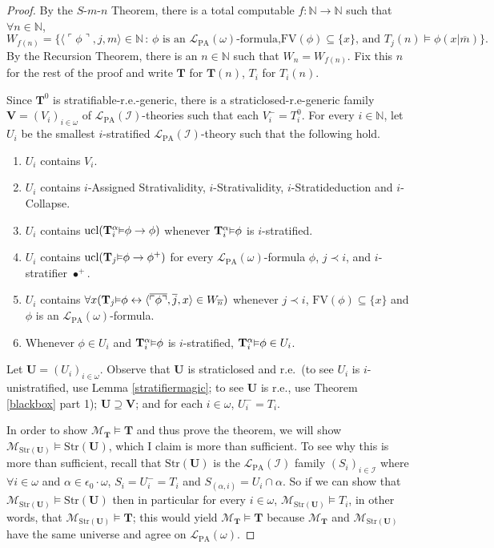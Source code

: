 \documentclass[reqno]{article}
\theoremstyle{definition}
\def\N{\mathbb{N}}
\def\L{\mathscr{L}}
\def\M{\mathscr{M}}
\def\T{\mathbf{T}}
\def\S{\mathbf{S}}
\def\U{\mathbf{U}}
\def\V{\mathbf{V}}
\def\FV{\mathrm{FV}}
\def\LPA{\L_{\mathrm{PA}}}
\def\epom{\epsilon_0\cdot\omega}
\def\indset{\mathcal I}
\renewcommand{\Pr}[1]{\T_{#1}\mbox{\small${\vDash}$}}
\newcommand{\Prr}[2]{\T^{#1}_{#2}\mbox{\small${\vDash}$}}
\newcommand{\ucl}[1]{\mathrm{ucl}(#1)}
\newcommand{\str}[1]{\mathrm{Str}(#1)} \newcommand{\Str}[1]{\str{#1}}
\begin{document}
\begin{proof}
By the $S$-$m$-$n$ Theorem, there is a total computable $f:\N\to\N$ such that $\forall n\in\N$,
\[
W_{f(n)}=\{\langle\ulcorner\phi\urcorner,j,m\rangle\in\N\,:\,\mbox{$\phi$ is an $\LPA(\omega)$-formula,
$\FV(\phi)\subseteq\{x\}$, and $T_j(n)\models\phi(x|\overline m)$}\}.
\]
By the Recursion Theorem, there is an $n\in\N$ such that $W_n=W_{f(n)}$.  Fix this $n$ for the rest of the proof
and write $\T$ for $\T(n)$, $T_i$ for $T_i(n)$.

Since $\T^0$ is stratifiable-r.e.-generic, there is 
a straticlosed-r.e-generic
family $\V=(V_i)_{i\in\omega}$ of $\LPA(\indset)$-theories such that each $V^-_i=T^0_i$.
For every $i\in\N$, let $U_i$ be the smallest
$i$-stratified $\LPA(\indset)$-theory such that the following hold.
\begin{enumerate}
\item $U_i$ contains $V_i$.
\item $U_i$ contains $i$-Assigned Strativalidity, $i$-Strativalidity, $i$-Stratideduction and $i$-Collapse.
\item $U_i$ contains $\ucl{\Prr\alpha i\phi\rightarrow\phi}$ whenever $\Prr\alpha i\phi$ is $i$-stratified.
\item $U_i$ contains $\ucl{\Pr j\phi\rightarrow\phi^+}$ for every $\LPA(\omega)$-formula $\phi$, $j\prec i$,
and $i$-stratifier $\bullet^+$.
\item $U_i$ contains $\forall x(\Pr j\phi\leftrightarrow\langle\overline{\ulcorner\phi\urcorner},\overline j,x\rangle\in W_{\overline n})$
whenever $j\prec i$, $\FV(\phi)\subseteq\{x\}$ and $\phi$ is an $\LPA(\omega)$-formula.
\item Whenever $\phi\in U_i$ and $\Prr\alpha i\phi$ is $i$-stratified, $\Prr\alpha i\phi\in U_i$.
\end{enumerate}
Let $\U=(U_i)_{i\in\omega}$.  Observe that $\U$ is straticlosed and r.e.~(to see $U_i$ is
$i$-unistratified, use
Lemma \ref{stratifiermagic}; to see $\U$ is r.e., use
Theorem \ref{blackbox} part 1); $\U\supseteq\V$; and for each $i\in\omega$,
$U_i^-=T_i$.


In order to show $\M_\T\models\T$ and thus prove the theorem,
we will show $\M_{\str{\U}}\models \str{\U}$, which I claim is more
than sufficient. To see why this is more than sufficient, recall that
$\str{\U}$ is the $\LPA(\indset)$ family $(S_i)_{i\in\indset}$
where $\forall i\in\omega$ and $\alpha\in\epom$, $S_i=U^-_i=T_i$ and
$S_{(\alpha,i)}=U_i\cap \alpha$.
So if we can show that $\M_{\str{\U}}\models \str{\U}$ then in particular
for every $i\in\omega$, $\M_{\str{\U}}\models T_i$, in other words,
that $\M_{\str{\U}}\models\T$; this would yield $\M_\T\models\T$ because
$\M_\T$ and $\M_{\str{\U}}$ have the same universe and agree on $\LPA(\omega)$.


\end{proof}
\end{document}
